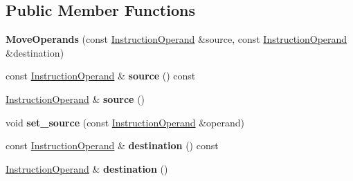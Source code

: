\subsection*{Public Member Functions}
\begin{DoxyCompactItemize}
\item 
\mbox{\label{classv8_1_1internal_1_1compiler_1_1MoveOperands_a1ae5e352302e69cd45bd33dacbd2895a}} 
{\bfseries Move\+Operands} (const \mbox{\hyperlink{classv8_1_1internal_1_1compiler_1_1InstructionOperand}{Instruction\+Operand}} \&source, const \mbox{\hyperlink{classv8_1_1internal_1_1compiler_1_1InstructionOperand}{Instruction\+Operand}} \&destination)
\item 
\mbox{\label{classv8_1_1internal_1_1compiler_1_1MoveOperands_ab7ec4333277310aa50f434ef05b9af55}} 
const \mbox{\hyperlink{classv8_1_1internal_1_1compiler_1_1InstructionOperand}{Instruction\+Operand}} \& {\bfseries source} () const
\item 
\mbox{\label{classv8_1_1internal_1_1compiler_1_1MoveOperands_a9d8da98e2f257e6082e71dbd4af879a9}} 
\mbox{\hyperlink{classv8_1_1internal_1_1compiler_1_1InstructionOperand}{Instruction\+Operand}} \& {\bfseries source} ()
\item 
\mbox{\label{classv8_1_1internal_1_1compiler_1_1MoveOperands_aff79a4dbeb36b580d0928f21bb281e73}} 
void {\bfseries set\+\_\+source} (const \mbox{\hyperlink{classv8_1_1internal_1_1compiler_1_1InstructionOperand}{Instruction\+Operand}} \&operand)
\item 
\mbox{\label{classv8_1_1internal_1_1compiler_1_1MoveOperands_a1720fd5547e444d6de0b1afe79a5b36a}} 
const \mbox{\hyperlink{classv8_1_1internal_1_1compiler_1_1InstructionOperand}{Instruction\+Operand}} \& {\bfseries destination} () const
\item 
\mbox{\label{classv8_1_1internal_1_1compiler_1_1MoveOperands_aa554b81587468e00d03b44e5ef1bf0d4}} 
\mbox{\hyperlink{classv8_1_1internal_1_1compiler_1_1InstructionOperand}{Instruction\+Operand}} \& {\bfseries destination} ()

\end{DoxyCompactItemize}
